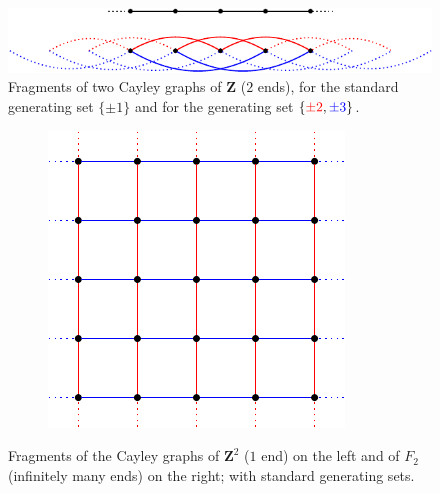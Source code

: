 \documentclass[a4paper]{article}
\theoremstyle{definition}
\theoremstyle{remark}%
\newcommand*{\field}[1]{\mathbf{#1}}
\newcommand*{\Z}{\field{Z}}
\begin{document}
%
%
\begin{figure}[htbp]\centering
\includegraphics{CayleyOfZ}
\caption{Fragments of two Cayley graphs of $\Z$ ($2$ ends), for the standard generating set $\{\pm1\}$ and for the generating set $\{\textcolor{red}{\pm2},\textcolor{blue}{\pm3}\}$.}
\label{Figure:CayleyOfZ}
\end{figure}
%
%
%
%
%
\begin{figure}[htbp]\centering
\begin{subfigure}{0.5\textwidth}
\centering
\includegraphics{CayleyOfZ2}
\end{subfigure}%
%
%
%
\begin{subfigure}{0.5\textwidth}
\centering
{}
\end{subfigure}
\caption{Fragments of the Cayley graphs of $\Z^2$ ($1$ end) on the left and of $F_2$ (infinitely many ends) on the right; with standard generating sets.}
\label{Figure:CayleyOfZ2}
\end{figure}
\end{document}
